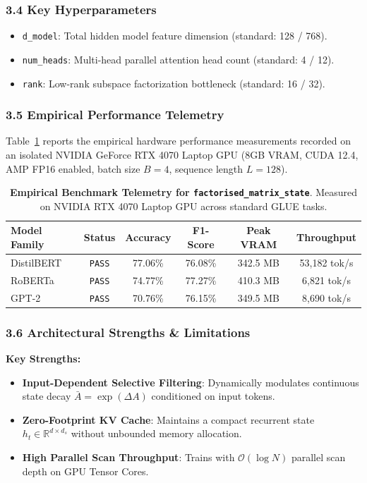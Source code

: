 \subsubsection*{3.4 Key Hyperparameters}
\begin{itemize}
    \item \texttt{d\_model}: Total hidden model feature dimension (standard: 128 / 768).
    \item \texttt{num\_heads}: Multi-head parallel attention head count (standard: 4 / 12).
    \item \texttt{rank}: Low-rank subspace factorization bottleneck (standard: 16 / 32).
\end{itemize}

\subsubsection*{3.5 Empirical Performance Telemetry}
Table~\ref{tab:telemetry_factorised_matrix_state} reports the empirical hardware performance measurements recorded on an isolated NVIDIA GeForce RTX 4070 Laptop GPU (8GB VRAM, CUDA 12.4, AMP FP16 enabled, batch size $B=4$, sequence length $L=128$).

\begin{table}[h]
\centering
\small
\caption{\textbf{Empirical Benchmark Telemetry for \texttt{factorised\_matrix\_state}}. Measured on NVIDIA RTX 4070 Laptop GPU across standard GLUE tasks.}
\label{tab:telemetry_factorised_matrix_state}
\begin{tabular*}{\columnwidth}{@{\extracolsep{\fill}}lccccc}
\toprule
\textbf{Model Family} & \textbf{Status} & \textbf{Accuracy} & \textbf{F1-Score} & \textbf{Peak VRAM} & \textbf{Throughput} \\
\midrule
DistilBERT & \texttt{PASS} & 77.06\% & 76.08\% & 342.5 MB & 53,182 tok/s \\
RoBERTa    & \texttt{PASS} & 74.77\% & 77.27\% & 410.3 MB & 6,821 tok/s \\
GPT-2      & \texttt{PASS} & 70.76\% & 76.15\% & 349.5 MB & 8,690 tok/s \\
\bottomrule
\end{tabular*}
\end{table}

\subsubsection*{3.6 Architectural Strengths \& Limitations}
\textbf{Key Strengths:}
\begin{itemize}
    \item \textbf{Input-Dependent Selective Filtering}: Dynamically modulates continuous state decay $\bar{A} = \exp(\Delta A)$ conditioned on input tokens.
    \item \textbf{Zero-Footprint KV Cache}: Maintains a compact recurrent state $h_t \in \mathbb{R}^{d \times d_s}$ without unbounded memory allocation.
    \item \textbf{High Parallel Scan Throughput}: Trains with $\mathcal{O}(\log N)$ parallel scan depth on GPU Tensor Cores.
\end{itemize}

